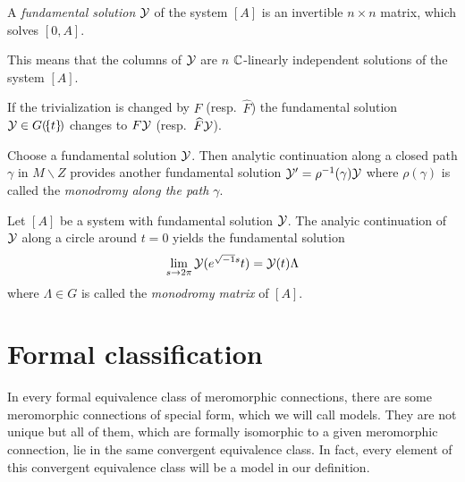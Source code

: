 \begin{defn}
  A \emph{fundamental solution} $\mathcal{Y}$ of the system $[A]$ is an invertible
  $n\times n$ matrix, which solves $[0,A]$.
  \begin{s-rem}
    This means that the columns of $\mathcal{Y}$ are $n$ $\mathbb{C}$-linearly independent
    solutions of the system $[A]$.
  \end{s-rem}
\end{defn}

\begin{rem}
  If the trivialization is changed by $F$ (resp.\ $\hat F$) the fundamental
  solution $\mathcal{Y}\in G(\!\{t\}\!)$ changes to $F\mathcal{Y}$ (resp.\ $\widehat F\mathcal{Y}$).
\end{rem}

\begin{comment}
  Unique \textbf{up to permutation}?\ or up to basis change?\ in the ramified
  case up to \TODO{}
\end{comment}

Choose a fundamental solution $\mathcal{Y}$. Then analytic continuation along a closed
path $\gamma$ in $M\backslash Z$ provides another fundamental solution
$\mathcal{Y}'=\rho^{-1}(\gamma)\mathcal{Y}$ where $\rho(\gamma)$ is called the \emph{monodromy
along the path $\gamma$}.
\begin{defn}
  Let $[A]$ be a system with fundamental solution $\mathcal{Y}$.
  The analyic continuation of $\mathcal{Y}$ along a circle around $t=0$ yields the
  fundamental solution
  \[
    \lim_{s\to2\pi}\mathcal{Y}(e^{\sqrt{-1}s}t)=\mathcal{Y}(t)\Lambda
  \]
  where $\Lambda\in G$ is called the \emph{monodromy matrix} of $[A]$.
\end{defn}

 

\begin{comment}
  \subsection{Ramification}
  \marginnote{\cite[I.5.4.1]{sabbah_cimpa90}}
\end{comment}

\section{Formal classification}\label{sec:formalClassification}
In every formal equivalence class of meromorphic connections, there are some
meromorphic connections of special form, which we will call models. They are
not unique but all of them, which are formally isomorphic to a given
meromorphic connection, lie in the same convergent equivalence class.
In fact, every element of this convergent equivalence class will be a model in
our definition.

